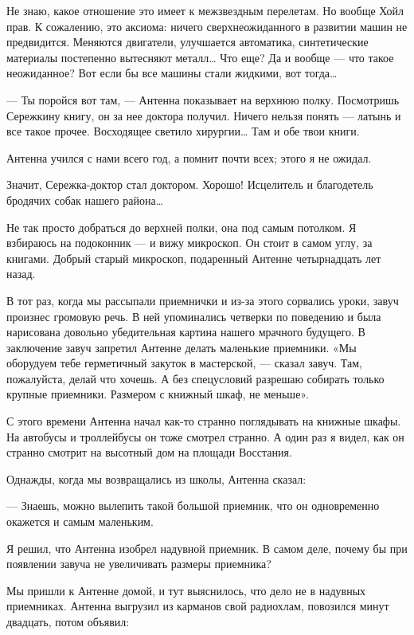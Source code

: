 Не знаю, какое отношение это имеет к межзвездным перелетам. Но вообще Хойл
прав. К сожалению, это аксиома: ничего сверхнеожиданного в развитии  машин
не предвидится. Меняются  двигатели, улучшается автоматика,  синтетические
материалы постепенно вытесняют металл…  Что еще? Да и  вообще — что  такое
неожиданное? Вот если бы все машины стали жидкими, вот тогда…

— Ты поройся вот  там, — Антенна показывает  на верхнюю полку.  Посмотришь
Сережкину книгу, он за нее доктора получил. Ничего нельзя понять —  латынь
и все такое прочее. Восходящее светило хирургии… Там и обе твои книги.

Антенна учился с нами всего год, а помнит почти всех; этого я не ожидал.

Значит, Сережка-доктор  стал доктором.  Хорошо! Исцелитель  и  благодетель
бродячих собак нашего района…

Не так  просто добраться  до  верхней полки,  она  под самым  потолком.  Я
взбираюсь на подоконник  — и  вижу микроскоп. Он  стоит в  самом углу,  за
книгами. Добрый  старый  микроскоп, подаренный  Антенне  четырнадцать  лет
назад.

В тот раз, когда  мы рассыпали приемнички и  из-за этого сорвались  уроки,
завуч произнес громовую речь.  В ней упоминались  четверки по поведению  и
была нарисована довольно убедительная картина нашего мрачного будущего.  В
заключение  завуч  запретил  Антенне   делать  маленькие  приемники.   «Мы
оборудуем тебе  герметичный закуток  в мастерской,  — сказал  завуч.  Там,
пожалуйста, делай что хочешь. А  без спецусловий разрешаю собирать  только
крупные приемники. Размером с книжный шкаф, не меньше».

С этого времени Антенна начал как-то странно поглядывать на книжные шкафы.
На автобусы и троллейбусы он тоже смотрел странно. А один раз я видел, как
он странно смотрит на высотный дом на площади Восстания.

Однажды, когда мы возвращались из школы, Антенна сказал:

— Знаешь,  можно  вылепить такой  большой  приемник, что  он  одновременно
окажется и самым маленьким.

Я решил, что Антенна  изобрел надувной приемник. В  самом деле, почему  бы
при появлении завуча не увеличивать размеры приемника?

Мы пришли  к Антенне  домой, и  тут  выяснилось, что  дело не  в  надувных
приемниках. Антенна выгрузил из  карманов свой радиохлам, повозился  минут
двадцать, потом объявил:

